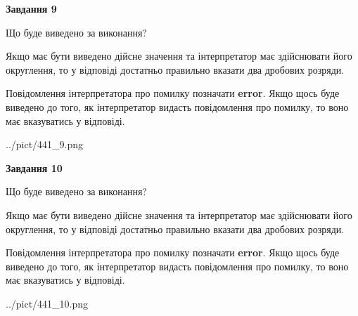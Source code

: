 \documentclass[12pt, ukrainian]{article}
\begin{document}
{\begin {Large}
{\begin {center}\textbf{Завдання 9}\end {center}}\par
Що буде виведено за виконання? \par

Якщо має бути виведено дійсне значення та інтерпретатор має здійснювати його округлення, 
то у відповіді достатньо правильно вказати два дробових розряди.

Повідомлення інтерпретатора про помилку позначати \textbf{error}.
Якщо щось буде виведено до того, як інтерпретатор видасть повідомлення про помилку, 
то воно має вказуватись у відповіді. \par

\begin{center}
	{../pict/441_9.png}
\end{center}
\newpage

{\begin {center}\textbf{Завдання 10}\end {center}}\par
Що буде виведено за виконання? \par

Якщо має бути виведено дійсне значення та інтерпретатор має здійснювати його округлення, 
то у відповіді достатньо правильно вказати два дробових розряди.

Повідомлення інтерпретатора про помилку позначати \textbf{error}.
Якщо щось буде виведено до того, як інтерпретатор видасть повідомлення про помилку, 
то воно має вказуватись у відповіді. \par

\begin{center}
	{../pict/441_10.png}
\end{center}
\newpage

\end {Large}}
\end{document}
